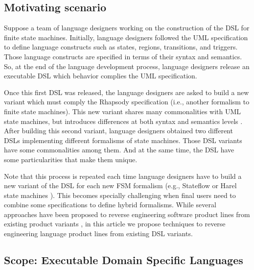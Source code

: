 
\subsection{Motivating scenario} Suppose a team of language designers working on the construction of the DSL for finite state machines. Initially, language designers followed the UML specification \cite{UML:2011} to define language constructs such as states, regions, transitions, and triggers. Those language constructs are specified in terms of their syntax and semantics. So, at the end of the language development process, language designers release an executable DSL which behavior complies the UML specification.

Once this first DSL was released, the language designers are asked to build a new variant which must comply the Rhapsody specification \cite{Harel:2004} (i.e., another formalism to finite state machines). This new variant shares many commonalities with UML state machines, but introduces differences at both syntax and semantics levels \cite{Crane:2007}. After building this second variant, language designers obtained two different DSLs implementing different formalisms of state machines. Those DSL variants have some commonalities among them. And at the same time, the DSL have some particularities that make them unique.

Note that this process is repeated each time language designers have to build a new variant of the DSL for each new FSM formalism (e.g., Stateflow \cite{Martaj:2010} or Harel state machines \cite{Harel:1996}). This becomes specially challenging when final users need to combine some specifications to define hybrid formalisms. While several approaches have been proposed to reverse engineering software product lines from existing product variants \cite{LopezHerrejon:2015,Martinez:2015,Martinez:2015b}, in this article we propose techniques to reverse engineering language product lines from existing DSL variants.

\subsection{Scope: \textbf{Executable Domain Specific Languages}}
\label{sec:technologicalscope}

